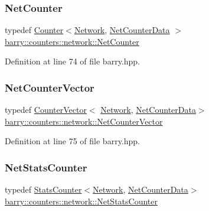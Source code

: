 \subsubsection{\texorpdfstring{Net\+Counter}{NetCounter}}
{\footnotesize\ttfamily typedef \hyperlink{classbarry_1_1_counter}{Counter}$<$\hyperlink{namespacebarry_1_1counters_1_1network_a4cb88d4572ded3b447ea269c9cd0b2c0}{Network}, \hyperlink{classbarry_1_1counters_1_1network_1_1_net_counter_data}{Net\+Counter\+Data} $>$ \hyperlink{namespacebarry_1_1counters_1_1network_a067bd9de04608fc2e1586324d3864a45}{barry\+::counters\+::network\+::\+Net\+Counter}}



Definition at line 74 of file barry.\+hpp.

\mbox{\label{namespacebarry_1_1counters_1_1network_a3b3c590303d47840d1967372ae495d95}} 
\subsubsection{\texorpdfstring{Net\+Counter\+Vector}{NetCounterVector}}
{\footnotesize\ttfamily typedef \hyperlink{classbarry_1_1_counter_vector}{Counter\+Vector}$<$ \hyperlink{namespacebarry_1_1counters_1_1network_a4cb88d4572ded3b447ea269c9cd0b2c0}{Network}, \hyperlink{classbarry_1_1counters_1_1network_1_1_net_counter_data}{Net\+Counter\+Data}$>$ \hyperlink{namespacebarry_1_1counters_1_1network_a3b3c590303d47840d1967372ae495d95}{barry\+::counters\+::network\+::\+Net\+Counter\+Vector}}



Definition at line 75 of file barry.\+hpp.

\mbox{\label{namespacebarry_1_1counters_1_1network_ae26c399917113fe280b3f2859376b8b9}} 
\subsubsection{\texorpdfstring{Net\+Stats\+Counter}{NetStatsCounter}}
{\footnotesize\ttfamily typedef \hyperlink{classbarry_1_1_stats_counter}{Stats\+Counter}$<$\hyperlink{namespacebarry_1_1counters_1_1network_a4cb88d4572ded3b447ea269c9cd0b2c0}{Network}, \hyperlink{classbarry_1_1counters_1_1network_1_1_net_counter_data}{Net\+Counter\+Data}$>$ \hyperlink{namespacebarry_1_1counters_1_1network_ae26c399917113fe280b3f2859376b8b9}{barry\+::counters\+::network\+::\+Net\+Stats\+Counter}}



